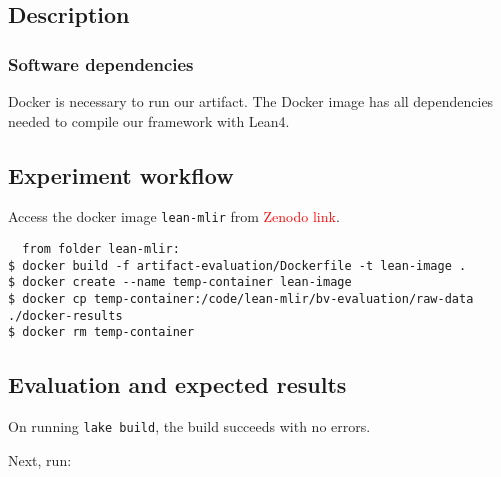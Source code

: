 \documentclass{sigplanconf}
\begin{document}
\subsection{Description}

\subsubsection{Software dependencies}

Docker is necessary to run our artifact.
The Docker image has all dependencies needed to compile our framework with Lean4.



\subsection{Experiment workflow}

Access the docker image \texttt{lean-mlir} from
\textcolor{red}{Zenodo link}.

\begin{verbatim}
  from folder lean-mlir: 
$ docker build -f artifact-evaluation/Dockerfile -t lean-image .
$ docker create --name temp-container lean-image
$ docker cp temp-container:/code/lean-mlir/bv-evaluation/raw-data ./docker-results
$ docker rm temp-container
\end{verbatim}



\subsection{Evaluation and expected results}

On running \texttt{lake build}, the build succeeds with no errors.

Next, run:
\end{document}
